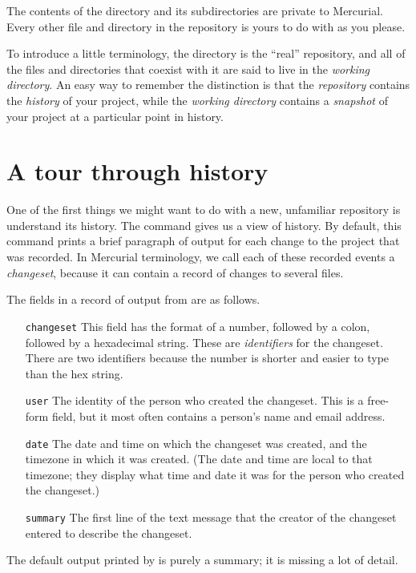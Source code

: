 The contents of the  directory and its subdirectories are
private to Mercurial.  Every other file and directory in the
repository is yours to do with as you please.

To introduce a little terminology, the  directory is the
``real'' repository, and all of the files and directories that coexist
with it are said to live in the \emph{working directory}.  An easy way
to remember the distinction is that the \emph{repository} contains the
\emph{history} of your project, while the \emph{working directory}
contains a \emph{snapshot} of your project at a particular point in
history.

\section{A tour through history}

One of the first things we might want to do with a new, unfamiliar
repository is understand its history.  The  command gives
us a view of history.
By default, this command prints a brief paragraph of output for each
change to the project that was recorded.  In Mercurial terminology, we
call each of these recorded events a \emph{changeset}, because it can
contain a record of changes to several files.

The fields in a record of output from  are as follows.
\begin{itemize}
\item[\texttt{changeset}] This field has the format of a number,
  followed by a colon, followed by a hexadecimal string.  These are
  \emph{identifiers} for the changeset.  There are two identifiers
  because the number is shorter and easier to type than the hex
  string.
\item[\texttt{user}] The identity of the person who created the
  changeset.  This is a free-form field, but it most often contains a
  person's name and email address.
\item[\texttt{date}] The date and time on which the changeset was
  created, and the timezone in which it was created.  (The date and
  time are local to that timezone; they display what time and date it
  was for the person who created the changeset.)
\item[\texttt{summary}] The first line of the text message that the
  creator of the changeset entered to describe the changeset.
\end{itemize}
The default output printed by  is purely a summary; it is
missing a lot of detail.

